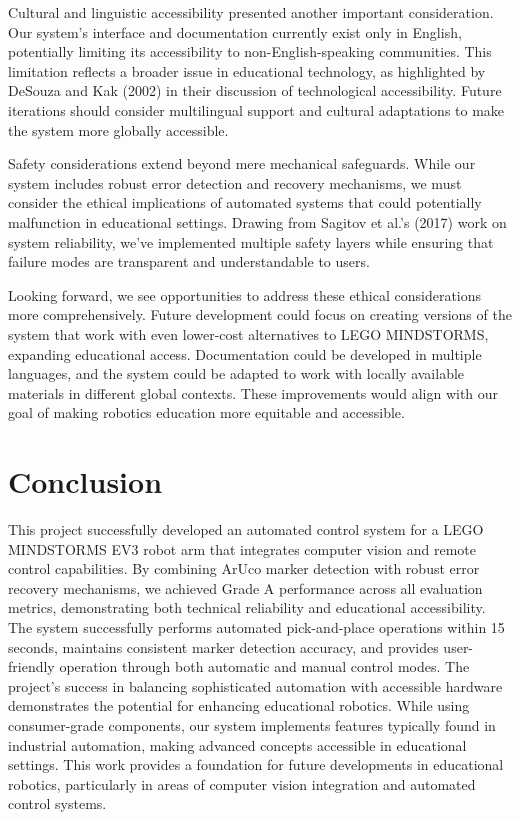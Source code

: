 \documentclass[10pt,twocolumn]{article}
\begin{document}
Cultural and linguistic accessibility presented another important consideration. Our system's interface and documentation currently exist only in English, potentially limiting its accessibility to non-English-speaking communities. This limitation reflects a broader issue in educational technology, as highlighted by DeSouza and Kak (2002) \cite{desouza2002vision} in their discussion of technological accessibility. Future iterations should consider multilingual support and cultural adaptations to make the system more globally accessible.

Safety considerations extend beyond mere mechanical safeguards. While our system includes robust error detection and recovery mechanisms, we must consider the ethical implications of automated systems that could potentially malfunction in educational settings. Drawing from Sagitov et al.'s (2017) \cite{sagitov2017comparing} work on system reliability, we've implemented multiple safety layers while ensuring that failure modes are transparent and understandable to users.

Looking forward, we see opportunities to address these ethical considerations more comprehensively. Future development could focus on creating versions of the system that work with even lower-cost alternatives to LEGO MINDSTORMS, expanding educational access. Documentation could be developed in multiple languages, and the system could be adapted to work with locally available materials in different global contexts. These improvements would align with our goal of making robotics education more equitable and accessible.



\section{Conclusion}
This project successfully developed an automated control system for a LEGO MINDSTORMS EV3 robot arm that integrates computer vision and remote control capabilities. By combining ArUco marker detection with robust error recovery mechanisms, we achieved Grade A performance across all evaluation metrics, demonstrating both technical reliability and educational accessibility. The system successfully performs automated pick-and-place operations within 15 seconds, maintains consistent marker detection accuracy, and provides user-friendly operation through both automatic and manual control modes.
The project's success in balancing sophisticated automation with accessible hardware demonstrates the potential for enhancing educational robotics. While using consumer-grade components, our system implements features typically found in industrial automation, making advanced concepts accessible in educational settings. This work provides a foundation for future developments in educational robotics, particularly in areas of computer vision integration and automated control systems.
\end{document}
